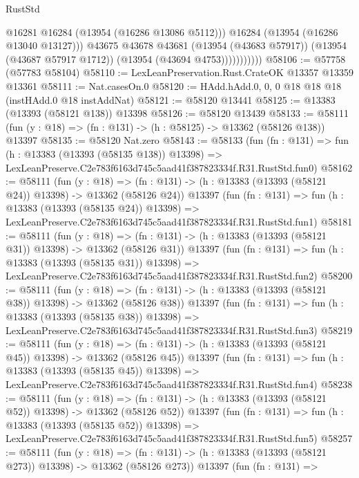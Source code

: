 \begin{lexlean}{RustStd}
\begin{coremodule}
                          @16281
                          @16284
                          (@13954 (@16286 @13086 @5112)))
                        @16284
                        (@13954 (@16286 @13040 @13127)))
                      @43675
                      @43678
                      @43681
                      (@13954 (@43683 @57917))
                      (@13954 (@43687 @57917 @1712))
                      (@13954 (@43694 @4753)))))))))))
@58106 := @57758 (@57783 @58104)
@58110 := LexLeanPreservation.Rust.CrateOK @13357 @13359 @13361
@58111 := Nat.casesOn.{0}
@58120 := HAdd.hAdd.{0, 0, 0} @18 @18 @18 (instHAdd.{0} @18 instAddNat)
@58121 := @58120 @13441
@58125 := @13383 (@13393 (@58121 @138)) @13398
@58126 := @58120 @13439
@58133 := @58111 (fun (y : @18) => (fn : @131) -> (h : @58125) -> @13362 (@58126 @138)) @13397
@58135 := @58120 Nat.zero
@58143 := @58133
    (fun (fn : @131) =>
    fun (h : @13383 (@13393 (@58135 @138)) @13398) =>
    LexLeanPreserve.C2e783f6163d745c5aad41f387823334f.R31.RustStd.fun0)
@58162 := @58111
    (fun (y : @18) =>
    (fn : @131) -> (h : @13383 (@13393 (@58121 @24)) @13398) -> @13362 (@58126 @24))
    @13397
    (fun (fn : @131) =>
    fun (h : @13383 (@13393 (@58135 @24)) @13398) =>
    LexLeanPreserve.C2e783f6163d745c5aad41f387823334f.R31.RustStd.fun1)
@58181 := @58111
    (fun (y : @18) =>
    (fn : @131) -> (h : @13383 (@13393 (@58121 @31)) @13398) -> @13362 (@58126 @31))
    @13397
    (fun (fn : @131) =>
    fun (h : @13383 (@13393 (@58135 @31)) @13398) =>
    LexLeanPreserve.C2e783f6163d745c5aad41f387823334f.R31.RustStd.fun2)
@58200 := @58111
    (fun (y : @18) =>
    (fn : @131) -> (h : @13383 (@13393 (@58121 @38)) @13398) -> @13362 (@58126 @38))
    @13397
    (fun (fn : @131) =>
    fun (h : @13383 (@13393 (@58135 @38)) @13398) =>
    LexLeanPreserve.C2e783f6163d745c5aad41f387823334f.R31.RustStd.fun3)
@58219 := @58111
    (fun (y : @18) =>
    (fn : @131) -> (h : @13383 (@13393 (@58121 @45)) @13398) -> @13362 (@58126 @45))
    @13397
    (fun (fn : @131) =>
    fun (h : @13383 (@13393 (@58135 @45)) @13398) =>
    LexLeanPreserve.C2e783f6163d745c5aad41f387823334f.R31.RustStd.fun4)
@58238 := @58111
    (fun (y : @18) =>
    (fn : @131) -> (h : @13383 (@13393 (@58121 @52)) @13398) -> @13362 (@58126 @52))
    @13397
    (fun (fn : @131) =>
    fun (h : @13383 (@13393 (@58135 @52)) @13398) =>
    LexLeanPreserve.C2e783f6163d745c5aad41f387823334f.R31.RustStd.fun5)
@58257 := @58111
    (fun (y : @18) =>
    (fn : @131) -> (h : @13383 (@13393 (@58121 @273)) @13398) -> @13362 (@58126 @273))
    @13397
    (fun (fn : @131) =>

\end{coremodule}
\end{lexlean}
